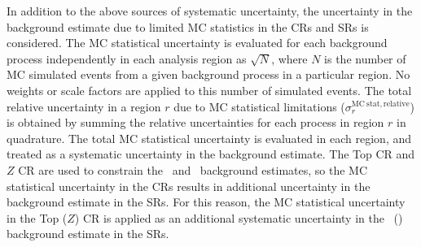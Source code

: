 In addition to the above sources of systematic uncertainty, the uncertainty
in the background estimate due to limited MC statistics in the CRs and SRs is
considered.
The MC statistical uncertainty is evaluated for each background process
independently in each analysis region as
$\sqrt{N}$, where $N$ is the number of MC simulated events from a given
background process in a particular region.
No weights or scale factors are applied to this number of simulated events.
The total relative uncertainty in a region $r$ due to MC statistical
limitations ($\sigma_{r}^\mathrm{MC~stat,relative}$) is obtained by summing the
relative uncertainties for each process in region $r$ in quadrature.
The total MC statistical uncertainty is evaluated in each region, and treated
as a systematic uncertainty in the background estimate.
The Top CR and $Z$ CR are used to constrain the \TTBAR\ and
\ZGAMMAJETS\ background estimates, so the MC statistical uncertainty in the
CRs results in additional uncertainty in the background estimate in the SRs.
For this reason, the MC statistical uncertainty in the Top ($Z$) CR is applied
as an additional systematic uncertainty in the \TTBAR\ (\ZGAMMAJETS) background
estimate in the SRs.

